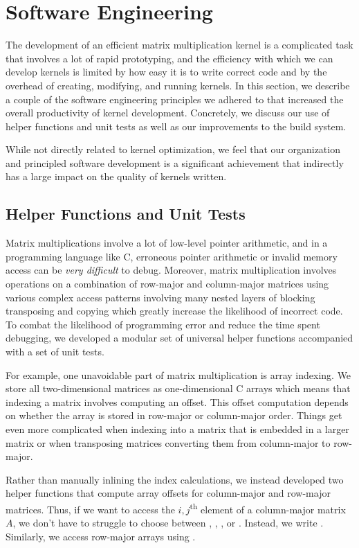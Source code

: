 \section{Software Engineering}\label{sec:sweng}
The development of an efficient matrix multiplication kernel is a complicated
task that involves a lot of rapid prototyping, and the efficiency with which we
can develop kernels is limited by how easy it is to write correct code and by
the overhead of creating, modifying, and running kernels. In this section, we
describe a couple of the software engineering principles we adhered to that
increased the overall productivity of kernel development. Concretely, we
discuss our use of helper functions and unit tests as well as our improvements
to the build system.

While not directly related to kernel optimization, we feel that our
organization and principled software development is a significant achievement
that indirectly has a large impact on the quality of kernels written.

\subsection{Helper Functions and Unit Tests}
Matrix multiplications involve a lot of low-level pointer arithmetic, and in a
programming language like C, erroneous pointer arithmetic or invalid memory
access can be \emph{very difficult} to debug. Moreover, matrix multiplication
involves operations on a combination of row-major and column-major matrices
using various complex access patterns involving many nested layers of blocking
transposing and copying which greatly increase the likelihood of incorrect
code. To combat the likelihood of programming error and reduce the time spent
debugging, we developed a modular set of universal helper functions accompanied
with a set of unit tests.

For example, one unavoidable part of matrix multiplication is array indexing.
We store all two-dimensional matrices as one-dimensional C arrays which means
that indexing a matrix involves computing an offset. This offset computation
depends on whether the array is stored in row-major  or column-major order.
Things get even more complicated when indexing into a matrix that is embedded
in a larger matrix or when transposing matrices converting them from
column-major to row-major.

Rather than manually inlining the index calculations, we instead developed two
helper functions that compute array offsets for column-major and row-major
matrices. Thus, if we want to access the $i,j$\textsuperscript{th} element of a
column-major matrix $A$, we don't have to struggle to choose between , , , or . Instead, we
write . Similarly, we access row-major arrays using
.

